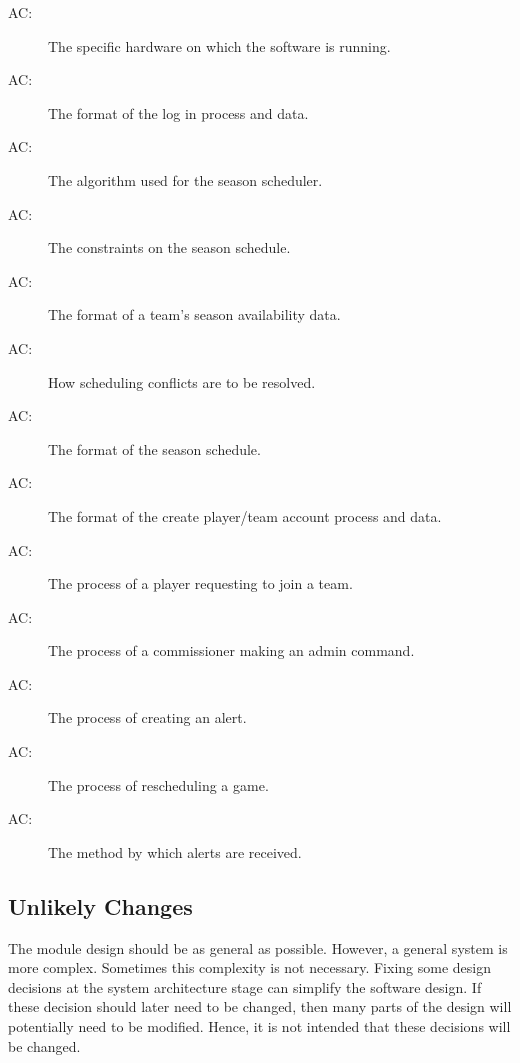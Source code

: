 \documentclass[12pt, titlepage]{article}
\newcounter{acnum}
\newcommand{\actheacnum}{AC\theacnum}
\begin{document}
\begin{description}
  \item[ \actheacnum \label{acHardware}:] The specific
  hardware on which the software is running.
  \item[ \actheacnum \label{acLogIn}:] The format of the
  log in process and data.
  \item[ \actheacnum \label{acSched}:] The algorithm
  used for the season scheduler.
  \item[ \actheacnum \label{acSchedConstraints}:] The
  constraints on the season schedule.
  \item[ \actheacnum \label{acAvailability}:] The format
  of a team's season availability data.
  \item[ \actheacnum \label{acSchedConflicts}:] How
  scheduling conflicts are to be resolved.
  \item[ \actheacnum \label{acSchedFormat}:] The format
  of the season schedule.
  \item[ \actheacnum \label{acCreateAccount}:] The
  format of the create player/team account process and data.
  \item[ \actheacnum \label{acJoinRequest}:] The process
  of a player requesting to join a team.
  \item[ \actheacnum \label{acAdmin}:] The process of a
  commissioner making an admin command.
  \item[ \actheacnum \label{acAlertSend}:] The process
  of creating an alert.
  \item[ \actheacnum \label{acReschedule}:] The process
  of rescheduling a game.
  \item[ \actheacnum \label{acAlertReceive}:] The method
  by which alerts are received.
\end{description}

\subsection{Unlikely Changes} \label{SecUchange}

The module design should be as general as possible. However, a general system is
more complex. Sometimes this complexity is not necessary. Fixing some design
decisions at the system architecture stage can simplify the software design. If
these decision should later need to be changed, then many parts of the design
will potentially need to be modified. Hence, it is not intended that these
decisions will be changed.
\end{document}
